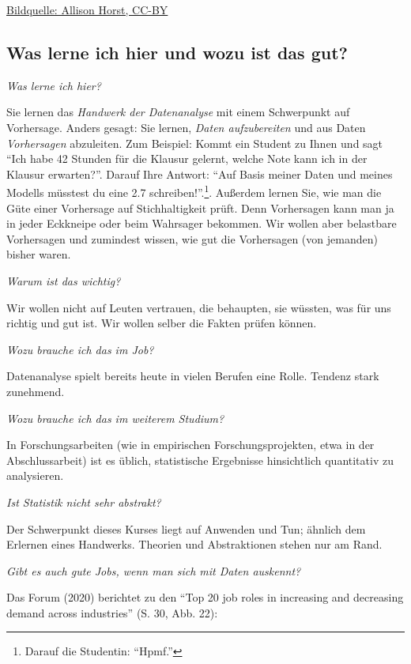 \documentclass[
  a4paper,
  DIV=11]{scrreprt}
\theoremstyle{definition}
\theoremstyle{definition}
\theoremstyle{definition}
\theoremstyle{remark}
\begin{document}
\href{https://github.com/allisonhorst/stats-illustrations}{Bildquelle:
Allison Horst, CC-BY}

\subsection{Was lerne ich hier und wozu ist das
gut?}\label{was-lerne-ich-hier-und-wozu-ist-das-gut}

\emph{Was lerne ich hier?}

Sie lernen das \emph{Handwerk der Datenanalyse} mit einem Schwerpunkt
auf Vorhersage. Anders gesagt: Sie lernen, \emph{Daten aufzubereiten}
und aus Daten \emph{Vorhersagen} abzuleiten. Zum Beispiel: Kommt ein
Student zu Ihnen und sagt ``Ich habe 42 Stunden für die Klausur gelernt,
welche Note kann ich in der Klausur erwarten?''. Darauf Ihre Antwort:
``Auf Basis meiner Daten und meines Modells müsstest du eine 2.7
schreiben!''.\footnote{Darauf die Studentin: ``Hpmf.''}. Außerdem lernen
Sie, wie man die Güte einer Vorhersage auf Stichhaltigkeit prüft. Denn
Vorhersagen kann man ja in jeder Eckkneipe oder beim Wahrsager bekommen.
Wir wollen aber belastbare Vorhersagen und zumindest wissen, wie gut die
Vorhersagen (von jemanden) bisher waren.

\emph{Warum ist das wichtig?}

Wir wollen nicht auf Leuten vertrauen, die behaupten, sie wüssten, was
für uns richtig und gut ist. Wir wollen selber die Fakten prüfen können.

\emph{Wozu brauche ich das im Job?}

Datenanalyse spielt bereits heute in vielen Berufen eine Rolle. Tendenz
stark zunehmend.

\emph{Wozu brauche ich das im weiterem Studium?}

In Forschungsarbeiten (wie in empirischen Forschungsprojekten, etwa in
der Abschlussarbeit) ist es üblich, statistische Ergebnisse hinsichtlich
quantitativ zu analysieren.

\emph{Ist Statistik nicht sehr abstrakt?}

Der Schwerpunkt dieses Kurses liegt auf Anwenden und Tun; ähnlich dem
Erlernen eines Handwerks. Theorien und Abstraktionen stehen nur am Rand.

\emph{Gibt es auch gute Jobs, wenn man sich mit Daten auskennt?}

Das Forum (2020) berichtet zu den ``Top 20 job roles in increasing and
decreasing demand across industries'' (S. 30, Abb. 22):
\end{document}
